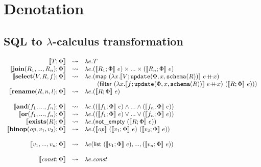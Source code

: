 
\section{Denotation}


\subsection{SQL to $\lambda$-calculus transformation}


\[
\begin{array}{rcl}
 \llbracket T; \Phi  \rrbracket& \leadsto& \lambda e.T\\
\llbracket \mathbf{join}(R_1,...,R_n);\Phi \rrbracket &\leadsto& \lambda e.(\llbracket R_1; \Phi\rrbracket~e)\times...\times(\llbracket R_n;\Phi\rrbracket~e)\\
\llbracket \mathbf{select}(V, R, f);\Phi \rrbracket &\leadsto& \lambda e. (\mathsf{map}~(\lambda x.\llbracket V;\mathtt{update}(\Phi, x, \mathtt{schema}(R)) \rrbracket~ e\concat x)\\
& & \qquad(\mathsf{filter}~(\lambda x.\llbracket f; \mathtt{update}(\Phi, x,\mathtt{schema}(R))\rrbracket~e\concat x)~ (\llbracket R;\Phi \rrbracket~e)))\\
\llbracket \mathbf{rename}(R, n, l);\Phi \rrbracket &\leadsto& \lambda e.(\llbracket R; \Phi\rrbracket~e)\\
\\
 \llbracket \mathbf{and}(f_1,...,f_n);\Phi \rrbracket &\leadsto& \lambda e.((\llbracket f_1;\Phi \rrbracket~e) \land ... \land (\llbracket f_n;\Phi \rrbracket~e))\\
\llbracket \mathbf{or}(f_1,...,f_n);\Phi \rrbracket &\leadsto& \lambda e.((\llbracket f_1;\Phi \rrbracket~e) \lor ... \lor (\llbracket f_n;\Phi \rrbracket~e))\\
\llbracket\mathbf{exists}(R);\Phi \rrbracket &\leadsto& \lambda e. (\mathsf{not\_empty}~(\llbracket R;\Phi \rrbracket~e))\\
\llbracket \mathbf{binop}(\mathit{op}, v_1, v_2);\Phi\rrbracket &\leadsto&  \lambda e.(\llbracket \mathit{op} \rrbracket~(\llbracket v_1;\Phi \rrbracket~e)~(\llbracket v_2;\Phi \rrbracket~e))\\
\\
 \llbracket v_1,...,v_n;\Phi \rrbracket & \leadsto &\lambda e(\mathsf{list}~(\llbracket v_1;\Phi\rrbracket~e),...,(\llbracket v_n;\Phi\rrbracket~e)) \\
 \\
\llbracket \mathit{const};\Phi \rrbracket & \leadsto & \lambda e.\mathit{const}\\

\end{array}\]
